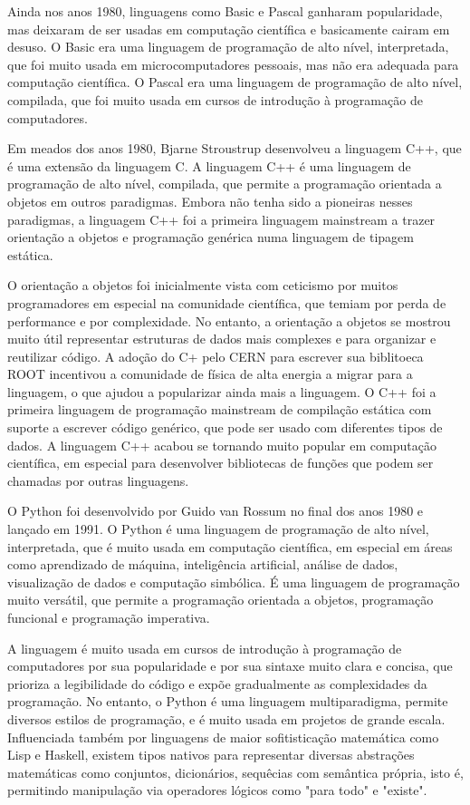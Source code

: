 Ainda nos anos 1980, linguagens como Basic e Pascal ganharam popularidade, mas deixaram de ser usadas em computação científica e basicamente cairam em desuso. O Basic era uma linguagem de programação de alto nível, interpretada, que foi muito usada em microcomputadores pessoais, mas não era adequada para computação científica. O Pascal era uma linguagem de programação de alto nível, compilada, que foi muito usada em cursos de introdução à programação de computadores.

Em meados dos anos 1980, Bjarne Stroustrup desenvolveu a linguagem C++, que é uma extensão da linguagem C. A linguagem C++ é uma linguagem de programação de alto nível, compilada, que permite a programação orientada a objetos em outros paradigmas. Embora não tenha sido a pioneiras nesses paradigmas, a linguagem C++ foi a primeira linguagem mainstream a trazer orientação a objetos e programação genérica numa linguagem de tipagem estática.

O orientação a objetos foi inicialmente vista com ceticismo por muitos programadores em especial na comunidade científica, que temiam por perda de performance e por complexidade. No entanto, a orientação a objetos se mostrou muito útil representar estruturas de dados mais complexes e para organizar e reutilizar código. A adoção do C+ pelo CERN para escrever sua biblitoeca ROOT incentivou a comunidade de física de alta energia a migrar para a linguagem, o que ajudou a popularizar ainda mais a linguagem. O C++ foi a primeira linguagem de programação mainstream de compilação estática com suporte a escrever código genérico, que pode ser usado com diferentes tipos de dados. A linguagem C++ acabou se tornando muito popular em computação científica, em especial para desenvolver bibliotecas de funções que podem ser chamadas por outras linguagens.

O Python foi desenvolvido por Guido van Rossum no final dos anos 1980 e lançado em 1991. O Python é uma linguagem de programação de alto nível, interpretada, que é muito usada em computação científica, em especial em áreas como aprendizado de máquina, inteligência artificial, análise de dados, visualização de dados e computação simbólica. É uma linguagem de programação muito versátil, que permite a programação orientada a objetos, programação funcional e programação imperativa. 

A linguagem é muito usada em cursos de introdução à programação de computadores por sua popularidade e por sua sintaxe muito clara e concisa, que prioriza a legibilidade do código e expõe gradualmente as complexidades da programação. No entanto, o Python é uma linguagem multiparadigma, permite diversos estilos de programação, e é muito usada em projetos de grande escala. Influenciada também por linguagens de maior sofitisticação matemática como Lisp e Haskell, existem tipos nativos para representar diversas abstrações matemáticas como conjuntos, dicionários, sequêcias com semântica própria, isto é, permitindo manipulação via operadores lógicos como "para todo" e "existe".

